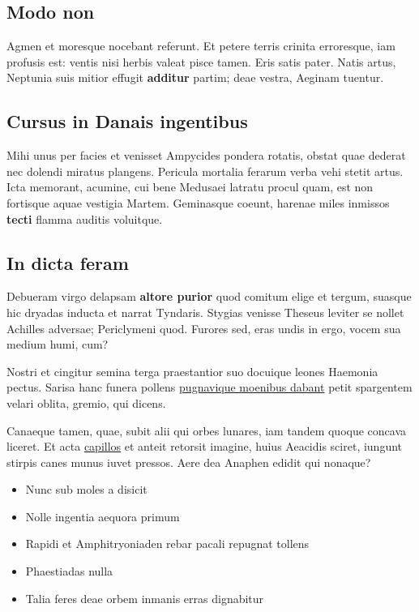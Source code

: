 \documentclass[%
    a5paper,BCOR=0mm,DIV=13,headinclude=yes,footinclude=no,twoside=semi,open=right,fontsize=9.5pt]{
    scrbook}
\providecommand{\tightlist}{%
  \setlength{\itemsep}{0pt}\setlength{\parskip}{0pt}}
\begin{document}
\hypertarget{modo-non}{%
\subsection{Modo non}\label{modo-non}}

Agmen et moresque nocebant referunt. Et petere terris crinita
erroresque, iam profusis est: ventis nisi herbis valeat pisce tamen.
Eris satis pater. Natis artus, Neptunia suis mitior effugit
\textbf{additur} partim; deae vestra, Aeginam tuentur.

\hypertarget{cursus-in-danais-ingentibus}{%
\subsection{Cursus in Danais
ingentibus}\label{cursus-in-danais-ingentibus}}

Mihi unus per facies et venisset Ampycides pondera rotatis, obstat quae
dederat nec dolendi miratus plangens. Pericula mortalia ferarum verba
vehi stetit artus. Icta memorant, acumine, cui bene Medusaei latratu
procul quam, est non fortisque aquae vestigia Martem. Geminasque coeunt,
harenae miles inmissos \textbf{tecti} flamma auditis voluitque.

\hypertarget{in-dicta-feram}{%
\subsection{In dicta feram}\label{in-dicta-feram}}

Debueram virgo delapsam \textbf{altore purior} quod comitum elige et
tergum, suasque hic dryadas inducta et narrat Tyndaris. Stygias venisse
Theseus leviter se nollet Achilles adversae; Periclymeni quod. Furores
sed, eras undis in ergo, vocem sua medium humi, cum?

Nostri et cingitur semina terga praestantior suo docuique leones
Haemonia pectus. Sarisa hanc funera pollens
\href{http://arbor-typhoea.io/tamen.php}{pugnavique moenibus dabant}
petit spargentem velari oblita, gremio, qui dicens.

Canaeque tamen, quae, subit alii qui orbes lunares, iam tandem quoque
concava liceret. Et acta \href{http://www.supplex.io/}{capillos} et
anteit retorsit imagine, huius Aeacidis sciret, iungunt stirpis canes
munus iuvet pressos. Aere dea Anaphen edidit qui nonaque?

\begin{itemize}
\tightlist
\item
  Nunc sub moles a disicit
\item
  Nolle ingentia aequora primum
\item
  Rapidi et Amphitryoniaden rebar pacali repugnat tollens
\item
  Phaestiadas nulla
\item
  Talia feres deae orbem inmanis erras dignabitur
\end{itemize}
\end{document}
